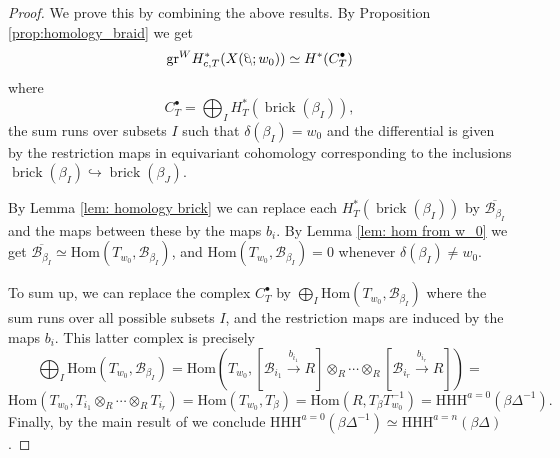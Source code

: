 \documentclass[10pt]{amsart}
\theoremstyle{plain}
\theoremstyle{definition}
\theoremstyle{remark}
\numberwithin{equation}{section}
\newcommand{\SB}{\mathscr{B}}
\newcommand{\HHH}{\mathrm{HHH}}
\newcommand{\Hom}{\mathrm{Hom}}
\newcommand{\brick}{\operatorname{brick}}
\DeclareRobustCommand{\ateb}{\text{\reflectbox{$\beta$}}}
\begin{document}
\begin{proof}
We prove this by combining the above results. By Proposition \ref{prop:homology_braid} we get
$$
\mathrm{gr}^{W}H_{c,T}^{*}(X(\ateb;w_0))\simeq H^*(C^{\bullet}_{T})
$$
where 
$$
C^{\bullet}_{T}=\bigoplus_{I} H^*_T(\brick(\beta_{I})),
$$
the sum runs over subsets $I$ such that $\delta(\beta_I)=w_0$ and the differential is given by the restriction maps in equivariant cohomology corresponding to the inclusions $\brick(\beta_I) \hookrightarrow \brick(\beta_J)$. 

\noindent By Lemma \ref{lem: homology brick} we can replace each 
$H^*_T(\brick(\beta_{I}))$ by $\overline{\SB_{\beta_I}}$ and the maps between these by the maps $b_i$. By Lemma \ref{lem: hom from w_0} we get  $\overline{\SB_{\beta_I}}\simeq \Hom(T_{w_0},\SB_{\beta_I})$,
and $\Hom(T_{w_0},\SB_{\beta_I})=0$ whenever $\delta(\beta_I)\neq w_0$. 

To sum up, we can replace the complex $C^{\bullet}_{T}$ by $\bigoplus_{I}\Hom(T_{w_0},\SB_{\beta_I})$ where the sum runs over all possible subsets $I$, and the restriction maps are induced by the maps $b_i$. This latter complex is precisely
$$
\bigoplus_{I}\Hom(T_{w_0},\SB_{\beta_I})=\Hom\left(T_{w_0},[\SB_{i_1}\xrightarrow{b_{i_1}} R]\otimes_{R} \cdots \otimes_{R} 
[\SB_{i_r}\xrightarrow{b_{i_r}} R]\right)=
$$
$$
\Hom(T_{w_0},T_{i_1}\otimes_R \cdots \otimes_R 
T_{i_r})=\Hom(T_{w_0},T_{\beta})=\Hom(R, T_{\beta}T_{w_0}^{-1})=\HHH^{a=0}(\beta\Delta^{-1}).
$$
Finally, by the main result of \cite{GHMN} we conclude $\HHH^{a=0}(\beta\Delta^{-1})\simeq \HHH^{a=n}(\beta\Delta)
$.
\end{proof}

 
\end{document}

